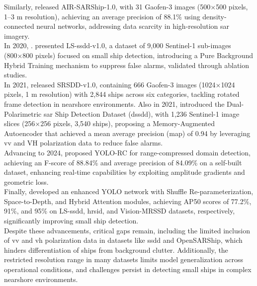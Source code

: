 \documentclass{article}
\begin{document}
Similarly, \cite{R19097} released AIR-SARShip-1.0, with 31 Gaofen-3 images (500×500 pixels, 1–3 m resolution), achieving an average precision of 88.1\% using density-connected neural networks, addressing data scarcity in high-resolution \acrshort{sar} imagery. \\

In 2020, \cite{rs12182997}. presented LS-\acrshort{ssdd}-v1.0, a dataset of 9,000 Sentinel-1 sub-images (800×800 pixels) focused on small ship detection, introducing a Pure Background Hybrid Training mechanism to suppress false alarms, validated through ablation studies. \\

In 2021, \cite{rs13245104} released SRSDD-v1.0, containing 666 Gaofen-3 images (1024×1024 pixels, 1 m resolution) with 2,844 ships across six categories, tackling rotated frame detection in nearshore environments. Also in 2021, \cite{s21248478} introduced the Dual-Polarimetric \acrshort{sar} Ship Detection Dataset (\acrshort{dssdd}), with 1,236 Sentinel-1 image slices (256×256 pixels, 3,540 ships), proposing a Memory-Augmented Autoencoder that achieved a mean average precision (\acrshort{map}) of 0.94 by leveraging \acrshort{vv} and VH polarization data to reduce false alarms. \\

Advancing to 2024, \cite{tan2024yolo} proposed YOLO-RC for range-compressed domain detection, achieving an F-score of 88.84\% and average precision of 84.09\% on a self-built dataset, enhancing real-time capabilities by exploiting amplitude gradients and geometric loss. \\

Finally, \cite{sun2025arbitrary} developed an enhanced YOLO network with Shuffle Re-parameterization, Space-to-Depth, and Hybrid Attention modules, achieving AP50 scores of 77.2\%, 91\%, and 95\% on LS-\acrshort{ssdd}, \acrshort{hrsid}, and Vision-MRSSD datasets, respectively, significantly improving small ship detection. \\

Despite these advancements, critical gaps remain, including the limited inclusion of \acrshort{vv} and \acrshort{vh} polarization data in datasets like \acrshort{ssdd} and OpenSARShip, which hinders differentiation of ships from background clutter. Additionally, the restricted resolution range in many datasets limits model generalization across operational conditions, and challenges persist in detecting small ships in complex nearshore environments. \\
\end{document}
